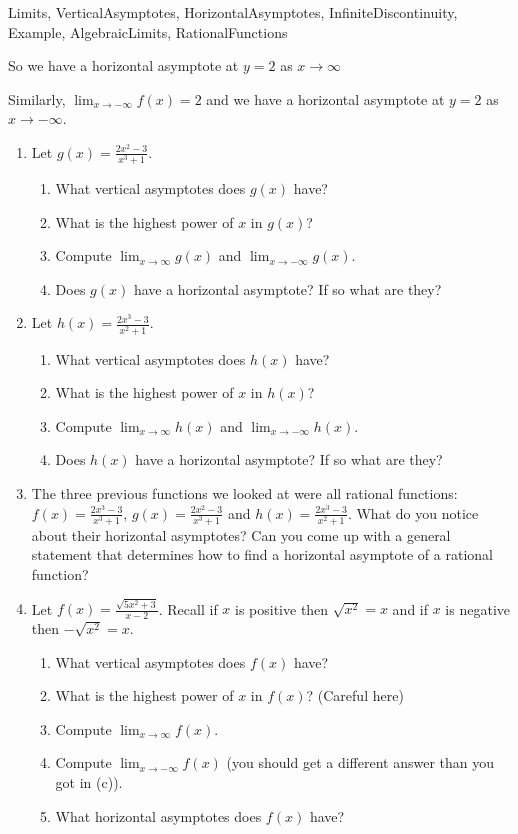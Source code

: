 \begin{tagblock}{Limits, VerticalAsymptotes, HorizontalAsymptotes, InfiniteDiscontinuity, Example, AlgebraicLimits, RationalFunctions}
\begin{question}
So we have a horizontal asymptote at $y=2$ as $x \to \infty$

Similarly, $ \lim_{x \to -\infty} f(x) = 2$ and we  have a horizontal asymptote at $y=2$ as $x \to -\infty$.

\begin{enumerate}
\item Let $\displaystyle g(x) = \frac{2x^2-3}{x^3+1}$.
\begin{enumerate}
\item What vertical asymptotes does $g(x)$ have?
\item What is the highest power of $x$ in $g(x)$?
\item Compute $\lim_{x \to \infty} g(x)$ and $\lim_{x \to -\infty} g(x)$.
\item Does $g(x)$ have a horizontal asymptote?  If so what are they?
\end{enumerate}

\newpage

\item Let $\displaystyle h(x) = \frac{2x^3-3}{x^2+1}$.
\begin{enumerate}
\item What vertical asymptotes does $h(x)$ have?
\item What is the highest power of $x$ in $h(x)$?
\item Compute $\lim_{x \to \infty} h(x)$ and $\lim_{x \to -\infty} h(x)$.
\item Does $h(x)$ have a horizontal asymptote?  If so what are they?
\end{enumerate}

\vspace{4in}

\item The three previous functions we looked at were all rational functions:  $\displaystyle f(x) = \frac{2x^3-3}{x^3+1}$, $\displaystyle g(x) = \frac{2x^2-3}{x^3+1}$ and $\displaystyle h(x) = \frac{2x^3-3}{x^2+1}$.  What do you notice about their horizontal asymptotes?  Can you come up with a general statement that determines how to find a horizontal asymptote of a rational function?




\newpage
\item Let $\displaystyle f(x) = \frac{\sqrt{5x^2+3}}{x-2}$.  Recall if $x$ is positive then $\sqrt{x^2} = x$ and if $x$ is negative then $-\sqrt{x^2} = x$.  
\begin{enumerate}
\item What vertical asymptotes does $f(x)$ have?
\item What is the highest power of $x$ in $f(x)$? (Careful here)
\item Compute $\lim_{x \to \infty} f(x)$.
\item Compute $\lim_{x \to -\infty} f(x)$ (you should get a different answer than you got in (c)).
\item What horizontal asymptotes does $f(x)$ have?
\end{enumerate}




\end{enumerate}
\end{question}
\end{tagblock}
